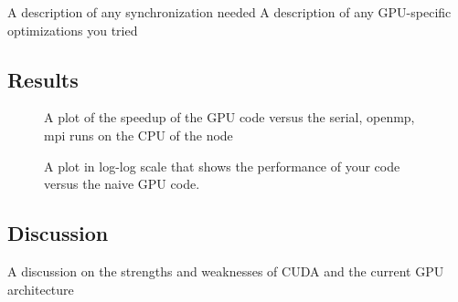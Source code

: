 \documentclass[12pt]{article}
\begin{document}
A description of any synchronization needed
A description of any GPU-specific optimizations you tried

\subsection{Results}

\begin{figure}
  \caption{A plot of the speedup of the GPU code versus the serial, openmp, mpi runs on the CPU of the node}
  \label{fig:gpu-speedup}
\end{figure}

\begin{figure}
  \caption{A plot in log-log scale that shows the performance of your code versus the naive GPU code.}
  \label{fig:gpu-naive}
\end{figure}

\subsection{Discussion}

A discussion on the strengths and weaknesses of CUDA and the current GPU architecture


%
\end{document}
